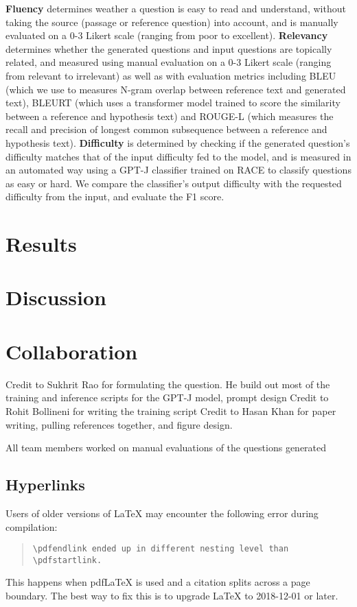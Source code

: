 \documentclass[11pt]{article}
\begin{document}
\textbf{Fluency} determines weather a question is easy to read and understand, without taking the source (passage or reference question) into account, and is manually evaluated on a 0-3 Likert scale (ranging from poor to excellent). \textbf{Relevancy} \cite{relevancy:5} determines whether the generated questions and input questions are topically related, and measured using manual evaluation on a 0-3 Likert scale (ranging from relevant to irrelevant) as well as with evaluation metrics including BLEU (which we use to measures N-gram overlap between reference text and generated text), BLEURT (which uses a transformer model trained to score the similarity between a reference and hypothesis text) and ROUGE-L (which measures the recall and precision of longest common subsequence between a reference and hypothesis
text). \textbf{Difficulty} is determined by checking if the generated question’s difficulty matches that of the input difficulty fed to the model, and is measured in an automated way using a GPT-J classifier trained on RACE to classify questions as easy or hard. We compare the classifier's output difficulty with the requested difficulty from the input, and evaluate the F1 score.  

\section{Results}

\section{Discussion}

\section{Collaboration}

Credit to Sukhrit Rao for formulating the question. He build out most of the training and inference scripts for the GPT-J model, prompt design  
Credit to Rohit Bollineni for writing the training script 
Credit to Hasan Khan for paper writing, pulling references together, and figure design.

All team members worked on manual evaluations of the questions generated 


\subsection{Hyperlinks}

Users of older versions of \LaTeX{} may encounter the following error during compilation: 
\begin{quote}
\tt\verb|\pdfendlink| ended up in different nesting level than \verb|\pdfstartlink|.
\end{quote}
This happens when pdf\LaTeX{} is used and a citation splits across a page boundary. The best way to fix this is to upgrade \LaTeX{} to 2018-12-01 or later.
\end{document}
